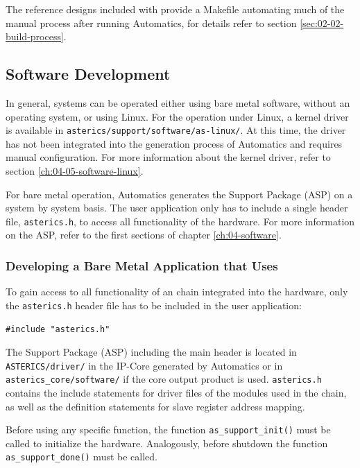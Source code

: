 The reference designs included with \asterics provide a Makefile automating much of the manual process after running Automatics, for details refer to section \ref{sec:02-02-build-process}.

\subsection{Software Development}

In general, \asterics systems can be operated either using bare metal software, without an operating system, or using Linux.
For the operation under Linux, a kernel driver is available in \texttt{asterics/support/software/as-linux/}.
At this time, the driver has not been integrated into the generation process of Automatics and requires manual configuration.
For more information about the kernel driver, refer to section \ref{ch:04-05-software-linux}.

For bare metal operation, Automatics generates the \asterics Support Package (ASP) on a system by system basis.
The user application only has to include a single header file, \texttt{asterics.h}, to access all functionality of the hardware.
For more information on the ASP, refer to the first sections of chapter \ref{ch:04-software}.

\subsubsection{Developing a Bare Metal Application that Uses \asterics}

To gain access to all functionality of an \asterics chain integrated into the hardware, only the \texttt{asterics.h} header file has to be included in the user application:
\begin{lstlisting}[style=CStyle]
#include "asterics.h"
\end{lstlisting}

The \asterics Support Package (ASP) including the main header is located in \texttt{ASTERICS/driver/} in the IP-Core generated by Automatics or in \texttt{asterics\_core/software/} if the \asterics core output product is used.
\texttt{asterics.h} contains the include statements for driver files of the modules used in the chain, as well as the definition statements for slave register address mapping.

Before using any \asterics specific function, the function \texttt{as\_support\_init()} must be called to initialize the hardware.
Analogously, before shutdown the function \texttt{as\_support\_done()} must be called.

